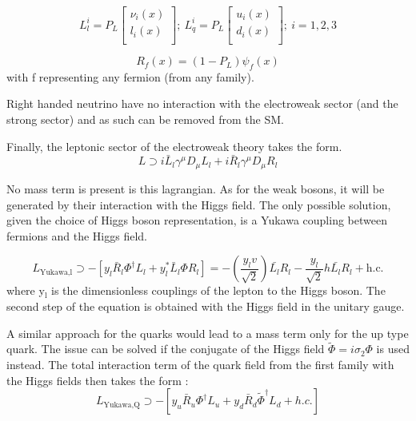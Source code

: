 \begin{enumerate}
\begin{equation}
L_l^i= P_L
\begin{bmatrix}
    \nu_i(x) \\
    l_i(x) \\
\end{bmatrix}
; \
L_q^i= P_L
\begin{bmatrix}
    u_i(x) \\
    d_i(x) \\
\end{bmatrix}
; \ i=1,2,3
\end{equation}

\begin{equation}
R_f(x) = (1-P_L) \psi_f(x)
\end{equation}
with f representing any fermion (from any family).

Right handed neutrino have no interaction with the electroweak sector (and the strong sector) and as such can be removed from the SM.

Finally, the leptonic sector of the electroweak theory takes the form.
\begin{equation}
L\supset i\bar{L}_l\gamma^\mu D_\mu L_l +  i \bar{R}_l\gamma^\mu D_\mu R_l
\end{equation}

No mass term is present is this lagrangian.
As for the weak bosons, it will be generated by their interaction with the Higgs field.
The only possible solution, given the choice of Higgs boson representation, is a Yukawa coupling between fermions and the Higgs field.

\begin{equation}
L_{\text{Yukawa,l}} \supset - \left[ y_l \bar{R}_l \Phi^\dagger L_l +y_l^*\bar{L}_l\Phi R_l  \right]  = -\left( \frac{y_l v}{\sqrt{2}}\right) \bar{L_l}R_l - \frac{y_l}{\sqrt{2}} h\bar{L_l}R_l + \text{h.c.}
\end{equation}
where y\(_{\text{l}}\) is the dimensionless couplings of the lepton to the Higgs boson.
The second step of the equation is obtained with the Higgs field in the unitary gauge.

A similar approach for the quarks would lead to a mass term only for the up type quark.
The issue can be solved if the conjugate of the Higgs field \(\tilde{\Phi}=i\sigma_2\Phi\) is used instead.
The total interaction term of the quark field from the first family with the Higgs fields then takes the form :
\begin{equation}
L_{\text{Yukawa,Q}} \supset - [ y_u \bar{R}_u \Phi^\dagger L_u + y_d \bar{R}_d \tilde{\Phi}^\dagger L_d + h.c.]
\end{equation}


\end{enumerate}
